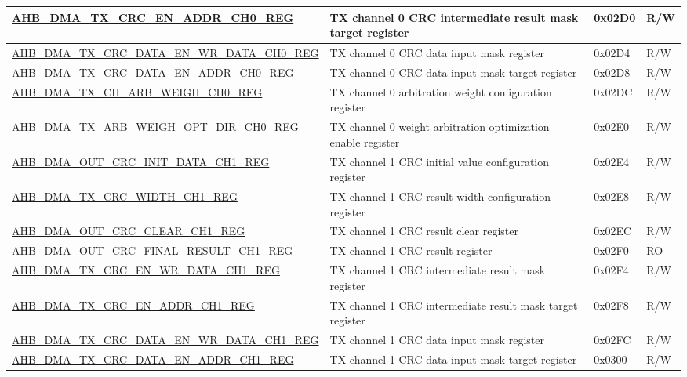 \begin{longtable}{ | l | p{10cm} | p{1.3cm} | l | }
\hyperref[regdesc:AHBDMATXCRCENADDRCHNREG]{AHB\_DMA\_TX\_CRC\_EN\_ADDR\_CH0\_REG} & TX channel 0 CRC intermediate result mask target register & 0x02D0 & R/W \\ \hline
\hyperref[regdesc:AHBDMATXCRCDATAENWRDATACHNREG]{AHB\_DMA\_TX\_CRC\_DATA\_EN\_WR\_DATA\_CH0\_REG} & TX channel 0 CRC data input mask register & 0x02D4 & R/W \\ \hline
\hyperref[regdesc:AHBDMATXCRCDATAENADDRCHNREG]{AHB\_DMA\_TX\_CRC\_DATA\_EN\_ADDR\_CH0\_REG} & TX channel 0 CRC data input mask target register & 0x02D8 & R/W \\ \hline
\hyperref[regdesc:AHBDMATXCHARBWEIGHCHNREG]{AHB\_DMA\_TX\_CH\_ARB\_WEIGH\_CH0\_REG} & TX channel 0 arbitration weight configuration register & 0x02DC & R/W \\ \hline
\hyperref[regdesc:AHBDMATXARBWEIGHOPTDIRCHNREG]{AHB\_DMA\_TX\_ARB\_WEIGH\_OPT\_DIR\_CH0\_REG} & TX channel 0 weight arbitration optimization enable register & 0x02E0 & R/W \\ \hline
\hyperref[regdesc:AHBDMAOUTCRCINITDATACHNREG]{AHB\_DMA\_OUT\_CRC\_INIT\_DATA\_CH1\_REG} & TX channel 1 CRC initial value configuration register & 0x02E4 & R/W \\ \hline
\hyperref[regdesc:AHBDMATXCRCWIDTHCHNREG]{AHB\_DMA\_TX\_CRC\_WIDTH\_CH1\_REG} & TX channel 1 CRC result width configuration register & 0x02E8 & R/W \\ \hline
\hyperref[regdesc:AHBDMAOUTCRCCLEARCHNREG]{AHB\_DMA\_OUT\_CRC\_CLEAR\_CH1\_REG} & TX channel 1 CRC result clear register & 0x02EC & R/W \\ \hline
\hyperref[regdesc:AHBDMAOUTCRCFINALRESULTCHNREG]{AHB\_DMA\_OUT\_CRC\_FINAL\_RESULT\_CH1\_REG} & TX channel 1 CRC result register & 0x02F0 & RO \\ \hline
\hyperref[regdesc:AHBDMATXCRCENWRDATACHNREG]{AHB\_DMA\_TX\_CRC\_EN\_WR\_DATA\_CH1\_REG} & TX channel 1 CRC intermediate result mask register & 0x02F4 & R/W \\ \hline
\hyperref[regdesc:AHBDMATXCRCENADDRCHNREG]{AHB\_DMA\_TX\_CRC\_EN\_ADDR\_CH1\_REG} & TX channel 1 CRC intermediate result mask target register & 0x02F8 & R/W \\ \hline
\hyperref[regdesc:AHBDMATXCRCDATAENWRDATACHNREG]{AHB\_DMA\_TX\_CRC\_DATA\_EN\_WR\_DATA\_CH1\_REG} & TX channel 1 CRC data input mask register & 0x02FC & R/W \\ \hline
\hyperref[regdesc:AHBDMATXCRCDATAENADDRCHNREG]{AHB\_DMA\_TX\_CRC\_DATA\_EN\_ADDR\_CH1\_REG} & TX channel 1 CRC data input mask target register  & 0x0300 & R/W \\ \hline

\end{longtable}
